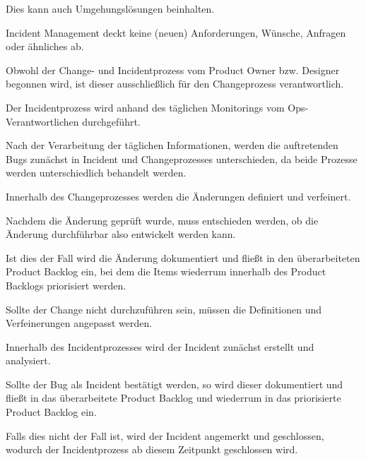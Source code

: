 Dies kann auch Umgehungslösungen beinhalten. 

Incident Management deckt keine (neuen) Anforderungen, Wünsche, Anfragen oder ähnliches ab.  

Obwohl der Change- und Incidentprozess vom Product Owner bzw. Designer begonnen wird, ist dieser ausschließlich für den Changeprozess verantwortlich. 

Der Incidentprozess wird anhand des täglichen Monitorings vom Ops-Verantwortlichen durchgeführt. 

Nach der Verarbeitung der täglichen Informationen, werden die auftretenden Bugs zunächst in Incident und Changeprozesses unterschieden, da beide Prozesse werden unterschiedlich behandelt werden.

Innerhalb des Changeprozesses werden die Änderungen definiert und verfeinert. 

Nachdem die Änderung geprüft wurde, muss entschieden werden, ob die Änderung durchführbar also entwickelt werden kann. 

Ist dies der Fall wird die Änderung dokumentiert und fließt in den überarbeiteten Product Backlog ein, bei dem die Items wiederrum innerhalb des Product Backlogs priorisiert werden. 

Sollte der Change nicht durchzuführen sein, müssen die Definitionen und Verfeinerungen angepasst werden.

Innerhalb des Incidentprozesses wird der Incident zunächst erstellt und analysiert.

Sollte der Bug als Incident bestätigt werden, so wird dieser dokumentiert und fließt in das überarbeitete Product Backlog und wiederrum in das priorisierte Product Backlog ein. 

Falls dies nicht der Fall ist, wird der Incident angemerkt und geschlossen, wodurch der Incidentprozess ab diesem Zeitpunkt geschlossen wird. 

